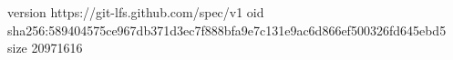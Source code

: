 version https://git-lfs.github.com/spec/v1
oid sha256:589404575ce967db371d3ec7f888bfa9e7c131e9ac6d866ef500326fd645ebd5
size 20971616

